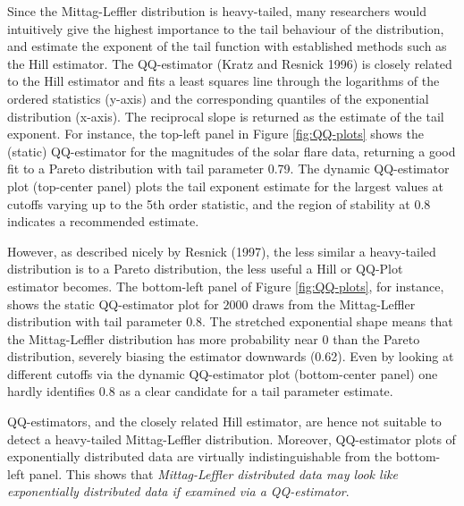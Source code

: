 \documentclass[smallextended]{svjour3}       %
\begin{document}
Since the Mittag-Leffler distribution is heavy-tailed, many researchers
would intuitively give the highest importance to the tail behaviour of
the distribution, and estimate the exponent of the tail function with
established methods such as the Hill estimator. The QQ-estimator (Kratz
and Resnick 1996) is closely related to the Hill estimator and fits a
least squares line through the logarithms of the ordered statistics
(y-axis) and the corresponding quantiles of the exponential distribution
(x-axis). The reciprocal slope is returned as the estimate of the tail
exponent. For instance, the top-left panel in Figure \ref{fig:QQ-plots}
shows the (static) QQ-estimator for the magnitudes of the solar flare
data, returning a good fit to a Pareto distribution with tail parameter
0.79. The dynamic QQ-estimator plot (top-center panel) plots the tail
exponent estimate for the largest values at cutoffs varying up to the
5th order statistic, and the region of stability at 0.8 indicates a
recommended estimate.

However, as described nicely by Resnick (1997), the less similar a
heavy-tailed distribution is to a Pareto distribution, the less useful a
Hill or QQ-Plot estimator becomes. The bottom-left panel of Figure
\ref{fig:QQ-plots}, for instance, shows the static QQ-estimator plot for
\(2000\) draws from the Mittag-Leffler distribution with tail parameter
\(0.8\). The stretched exponential shape means that the Mittag-Leffler
distribution has more probability near \(0\) than the Pareto
distribution, severely biasing the estimator downwards (0.62). Even by
looking at different cutoffs via the dynamic QQ-estimator plot
(bottom-center panel) one hardly identifies \(0.8\) as a clear candidate
for a tail parameter estimate.

QQ-estimators, and the closely related Hill estimator, are hence not
suitable to detect a heavy-tailed Mittag-Leffler distribution. Moreover,
QQ-estimator plots of exponentially distributed data are virtually
indistinguishable from the bottom-left panel. This shows that
\emph{Mittag-Leffler distributed data may look like exponentially
distributed data if examined via a QQ-estimator}.
\end{document}
